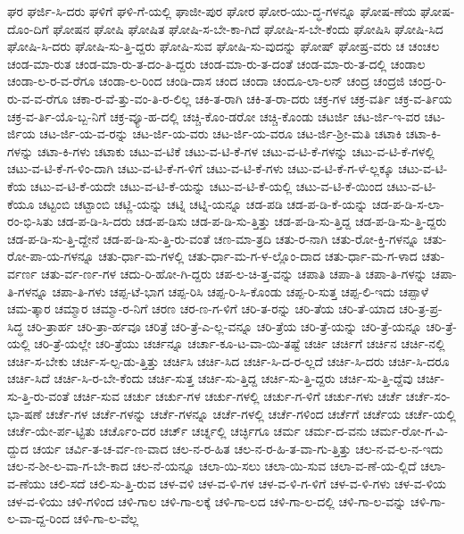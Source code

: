 {ಘರ
ಘರ್ಜಿ-ಸಿ-ದರು
ಘಳಿಗೆ
ಘಳಿ-ಗೆ-ಯಲ್ಲಿ
ಘಾಜೀ-ಪುರ
ಘೋರ
ಘೋರ-ಯು-ದ್ಧ-ಗಳನ್ನೂ
ಘೋಷ-ಣೆಯ
ಘೋಷ-ದೊಂ-ದಿಗೆ
ಘೋಷನ
ಘೋಷಿ
ಘೋಷಿತ
ಘೋಷಿ-ಸ-ಬೇ-ಕಾ-ಗಿದೆ
ಘೋಷಿ-ಸ-ಬೇ-ಕೆಂದು
ಘೋಷಿಸಿ
ಘೋಷಿ-ಸಿದ
ಘೋಷಿ-ಸಿ-ದರು
ಘೋಷಿ-ಸು-ತ್ತಿ-ದ್ದರು
ಘೋಷಿ-ಸುವ
ಘೋಷಿ-ಸು-ವುದನ್ನು
ಘೋಷ್
ಘೋಷ್ರ-ವರು
ಚ
ಚಂಚಲ
ಚಂಡ-ಮಾ-ರುತ
ಚಂಡ-ಮಾ-ರು-ತ-ದಂ-ತಿ-ದ್ದರು
ಚಂಡ-ಮಾ-ರು-ತ-ದಂತೆ
ಚಂಡ-ಮಾ-ರು-ತ-ದಲ್ಲಿ
ಚಂಡಾಲ
ಚಂಡಾ-ಲ-ರ-ವ-ರೆಗೂ
ಚಂಡಾ-ಲ-ರಿಂದ
ಚಂಡಿ-ದಾಸ
ಚಂದ
ಚಂದಾ
ಚಂದೂ-ಲಾ-ಲನ್
ಚಂದ್ರ
ಚಂದ್ರಜಿ
ಚಂದ್ರ-ರಿ-ರು-ವ-ವ-ರೆಗೂ
ಚಕಾ-ರ-ವೆ-ತ್ತು-ವಂ-ತಿ-ರ-ಲಿಲ್ಲ
ಚಕಿ-ತ-ರಾಗಿ
ಚಕಿ-ತ-ರಾ-ದರು
ಚಕ್ರ-ಗಳ
ಚಕ್ರ-ವರ್ತಿ
ಚಕ್ರ-ವ-ರ್ತಿಯ
ಚಕ್ರ-ವ-ರ್ತಿ-ಯೊ-ಬ್ಬ-ನಿಗೆ
ಚಕ್ರ-ವ್ಯೂ-ಹ-ದಲ್ಲಿ
ಚಚ್ಚಿ-ಕೊಂ-ಡರೋ
ಚಚ್ಚಿ-ಕೊಂಡು
ಚಟರ್ಜಿ
ಚಟ-ರ್ಜಿ-ಇ-ವರ
ಚಟ-ರ್ಜಿಯ
ಚಟ-ರ್ಜಿ-ಯ-ವ-ರನ್ನು
ಚಟ-ರ್ಜಿ-ಯ-ವರು
ಚಟ-ರ್ಜಿ-ಯ-ವರೂ
ಚಟ-ರ್ಜಿ-ಶ್ರೀ-ಮತಿ
ಚಟಾಕಿ
ಚಟಾ-ಕಿ-ಗಳನ್ನು
ಚಟಾ-ಕಿ-ಗಳು
ಚಟಾಕು
ಚಟು-ವ-ಟಿಕೆ
ಚಟು-ವ-ಟಿ-ಕೆ-ಗಳ
ಚಟು-ವ-ಟಿ-ಕೆ-ಗಳನ್ನು
ಚಟು-ವ-ಟಿ-ಕೆ-ಗಳಲ್ಲಿ
ಚಟು-ವ-ಟಿ-ಕೆ-ಗ-ಳಿಂ-ದಾಗಿ
ಚಟು-ವ-ಟಿ-ಕೆ-ಗ-ಳಿಗೆ
ಚಟು-ವ-ಟಿ-ಕೆ-ಗಳು
ಚಟು-ವ-ಟಿ-ಕೆ-ಗ-ಳೆ-ಲ್ಲಕ್ಕೂ
ಚಟು-ವ-ಟಿ-ಕೆಯ
ಚಟು-ವ-ಟಿ-ಕೆ-ಯದೇ
ಚಟು-ವ-ಟಿ-ಕೆ-ಯನ್ನು
ಚಟು-ವ-ಟಿ-ಕೆ-ಯಲ್ಲಿ
ಚಟು-ವ-ಟಿ-ಕೆ-ಯಿಂದ
ಚಟು-ವ-ಟಿ-ಕೆಯೂ
ಚಟ್ಟಂಬಿ
ಚಟ್ಟಾಂಬಿ
ಚಟ್ಣಿ-ಯನ್ನು
ಚಟ್ನಿ
ಚಟ್ನಿ-ಯನ್ನೂ
ಚಡ-ಪಡಿ
ಚಡ-ಪ-ಡಿ-ಕೆ-ಯನ್ನು
ಚಡ-ಪ-ಡಿ-ಸ-ಲಾ-ರಂ-ಭಿ-ಸಿತು
ಚಡ-ಪ-ಡಿ-ಸಿ-ದರು
ಚಡ-ಪ-ಡಿಸು
ಚಡ-ಪ-ಡಿ-ಸು-ತ್ತಿತ್ತು
ಚಡ-ಪ-ಡಿ-ಸು-ತ್ತಿದ್ದ
ಚಡ-ಪ-ಡಿ-ಸು-ತ್ತಿ-ದ್ದರು
ಚಡ-ಪ-ಡಿ-ಸು-ತ್ತಿ-ದ್ದೇನೆ
ಚಡ-ಪ-ಡಿ-ಸು-ತ್ತಿ-ರು-ವಂತೆ
ಚಣ-ಮಾ-ತ್ರದಿ
ಚತು-ರ-ನಾಗಿ
ಚತು-ರೋ-ಕ್ತಿ-ಗಳನ್ನೂ
ಚತು-ರೋ-ಪಾ-ಯ-ಗಳನ್ನೂ
ಚತು-ರ್ಧಾ-ಮ-ಗಳಲ್ಲಿ
ಚತು-ರ್ಧಾ-ಮ-ಗ-ಳ-ಲ್ಲೊಂ-ದಾದ
ಚತು-ರ್ಧಾ-ಮ-ಗ-ಳಾದ
ಚತು-ರ್ವರ್ಣ
ಚತು-ರ್ವ-ರ್ಣ-ಗಳ
ಚದು-ರಿ-ಹೋ-ಗಿ-ದ್ದರು
ಚಪ-ಲ-ಚಿ-ತ್ತ-ವನ್ನು
ಚಪಾತಿ
ಚಪಾ-ತಿ
ಚಪಾ-ತಿ-ಗಳನ್ನು
ಚಪಾ-ತಿ-ಗಳನ್ನೂ
ಚಪಾ-ತಿ-ಗಳು
ಚಪ್ಪ-ಟೆ-ಭಾಗ
ಚಪ್ಪ-ರಿಸಿ
ಚಪ್ಪ-ರಿ-ಸಿ-ಕೊಂಡು
ಚಪ್ಪ-ರಿ-ಸುತ್ತ
ಚಪ್ಪ-ಲಿ-ಇದು
ಚಪ್ಪಾಳೆ
ಚಮ-ತ್ಕಾರ
ಚಮ್ಮಾರ
ಚಮ್ಮಾ-ರ-ನಿಗೆ
ಚರಣ
ಚರ-ಣ-ಗ-ಳಿಗೆ
ಚರಿ-ತ-ರನ್ನು
ಚರಿ-ತೆಯ
ಚರಿ-ತೆ-ಯಾದ
ಚರಿ-ತ್ರ-ಪ್ರ-ಸಿದ್ಧ
ಚರಿ-ತ್ರಾರ್ಹ
ಚರಿ-ತ್ರಾ-ರ್ಹವೂ
ಚರಿತ್ರೆ
ಚರಿ-ತ್ರೆ-ಎ-ಲ್ಲ-ವನ್ನೂ
ಚರಿ-ತ್ರೆಯ
ಚರಿ-ತ್ರೆ-ಯನ್ನು
ಚರಿ-ತ್ರೆ-ಯನ್ನೂ
ಚರಿ-ತ್ರೆ-ಯಲ್ಲಿ
ಚರಿ-ತ್ರೆ-ಯಲ್ಲೇ
ಚರಿ-ತ್ರೆಯು
ಚರ್ಚನ್ನೂ
ಚರ್ಚಾ-ಕೂ-ಟ-ವಾ-ಯಿ-ತಷ್ಟೆ
ಚರ್ಚಿ
ಚರ್ಚಿಗೆ
ಚರ್ಚಿನ
ಚರ್ಚಿ-ನಲ್ಲಿ
ಚರ್ಚಿ-ಸ-ಬೇಕು
ಚರ್ಚಿ-ಸ-ಲ್ಪ-ಡು-ತ್ತಿತ್ತು
ಚರ್ಚಿಸಿ
ಚರ್ಚಿ-ಸಿದ
ಚರ್ಚಿ-ಸಿ-ದ-ರ-ಲ್ಲದೆ
ಚರ್ಚಿ-ಸಿ-ದರು
ಚರ್ಚಿ-ಸಿ-ದರೂ
ಚರ್ಚಿ-ಸಿದೆ
ಚರ್ಚಿ-ಸಿ-ರ-ಬೇ-ಕೆಂದು
ಚರ್ಚಿ-ಸುತ್ತ
ಚರ್ಚಿ-ಸು-ತ್ತಿದ್ದ
ಚರ್ಚಿ-ಸು-ತ್ತಿ-ದ್ದರು
ಚರ್ಚಿ-ಸು-ತ್ತಿ-ದ್ದೆವು
ಚರ್ಚಿ-ಸು-ತ್ತಿ-ರು-ವಂತೆ
ಚರ್ಚಿ-ಸುವ
ಚರ್ಚು
ಚರ್ಚು-ಗಳ
ಚರ್ಚು-ಗಳಲ್ಲಿ
ಚರ್ಚು-ಗ-ಳಿಗೆ
ಚರ್ಚು-ಗಳು
ಚರ್ಚೆ
ಚರ್ಚೆ-ಸಂ-ಭಾ-ಷಣೆ
ಚರ್ಚೆ-ಗಳ
ಚರ್ಚೆ-ಗಳನ್ನು
ಚರ್ಚೆ-ಗಳನ್ನೂ
ಚರ್ಚೆ-ಗಳಲ್ಲಿ
ಚರ್ಚೆ-ಗಳಿಂದ
ಚರ್ಚೆಗೆ
ಚರ್ಚೆಯ
ಚರ್ಚೆ-ಯಲ್ಲಿ
ಚರ್ಚೆ-ಯೇ-ರ್ಪ-ಟ್ಟಿತು
ಚರ್ಚೊಂ-ದರ
ಚರ್ಚ್
ಚರ್ಚ್ನಲ್ಲಿ
ಚರ್ಚ್ಳಿಗೂ
ಚರ್ಮ
ಚರ್ಮ-ದ-ವನು
ಚರ್ಮ-ರೋ-ಗ-ವಿ-ದ್ದುದ
ಚರ್ಯ
ಚರ್ವಿ-ತ-ಚ-ರ್ವ-ಣ-ವಾದ
ಚಲ-ನ-ರ-ಹಿತ
ಚಲ-ನ-ರ-ಹಿ-ತ-ವಾ-ಗು-ತ್ತಿತ್ತು
ಚಲ-ನ-ವ-ಲ-ನ-ಇದು
ಚಲ-ನ-ಶೀ-ಲ-ವಾ-ಗ-ಬೇ-ಕಾದ
ಚಲ-ನೆ-ಯನ್ನೂ
ಚಲಾ-ಯಿ-ಸಲು
ಚಲಾ-ಯಿ-ಸುವ
ಚಲಾ-ವ-ಣೆ-ಯ-ಲ್ಲಿದೆ
ಚಲಾ-ವ-ಣೆಯು
ಚಲಿ-ಸದೆ
ಚಲಿ-ಸು-ತ್ತಿ-ರುವ
ಚಳ-ವಳಿ
ಚಳ-ವ-ಳಿ-ಗಳ
ಚಳ-ವ-ಳಿ-ಗ-ಳಿಗೆ
ಚಳ-ವ-ಳಿ-ಗಳು
ಚಳ-ವ-ಳಿಯ
ಚಳ-ವ-ಳಿಯು
ಚಳಿ-ಗಳಿಂದ
ಚಳಿ-ಗಾಲ
ಚಳಿ-ಗಾ-ಲಕ್ಕೆ
ಚಳಿ-ಗಾ-ಲದ
ಚಳಿ-ಗಾ-ಲ-ದಲ್ಲಿ
ಚಳಿ-ಗಾ-ಲ-ವನ್ನು
ಚಳಿ-ಗಾ-ಲ-ವಾ-ದ್ದ-ರಿಂದ
ಚಳಿ-ಗಾ-ಲ-ವೆಲ್ಲ
}
